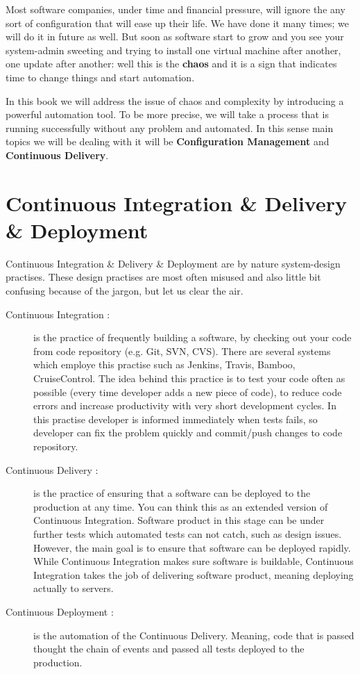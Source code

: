 \documentclass[10pt]{book}
\begin{document}
Most software companies, under time and financial pressure, will ignore the any sort of 
configuration that will ease up their life. We have done it many times; we will do it in future as well. 
But soon as software start to grow and you see your system-admin sweeting and trying to 
install one virtual machine after another, one update after another: 
well this is the {\bf chaos} and it is a sign that indicates time to change things and start automation.

In this book we will address the issue of chaos and complexity by 
introducing a powerful automation tool.  To be more precise, we will take a 
process that is running successfully without any problem and automated. 
In this sense main topics we will be dealing with it will be {\bf Configuration Management} 
and {\bf Continuous Delivery}.

\section{Continuous Integration \& Delivery \& Deployment}
Continuous Integration \& Delivery \& Deployment are by nature system-design practises.
These design practises are most often misused and also little bit confusing 
because of the jargon, but let us clear the air. 


\begin{description}

\item[Continuous Integration :] is the practice of frequently building a software, by 
checking out your code from code repository (e.g. Git, SVN, CVS). There are several systems which employe 
this practise such as Jenkins, Travis, Bamboo, CruiseControl. The idea behind this 
practice is to test your code often as possible (every time developer adds a new piece of code), to reduce code errors and 
increase productivity with very short development cycles. In this practise 
developer is informed immediately when tests fails, so developer can fix the 
problem quickly and commit/push changes to code repository.

\item[Continuous Delivery :] is the practice of ensuring that a software can be 
deployed to the production at any time. You can think this as an extended version of Continuous 
Integration. Software product in this stage can be under further tests which automated tests can not catch, 
such as design issues. However, the main goal is to ensure that software can be deployed rapidly. 
While Continuous Integration makes sure software is buildable, Continuous Integration 
takes the job of delivering software product, meaning deploying actually to 
servers.

\item[Continuous Deployment :] is the automation of the Continuous Delivery. 
Meaning, code that is passed thought the chain of events and passed all tests 
deployed to the production. 

\end{description}
\end{document}
